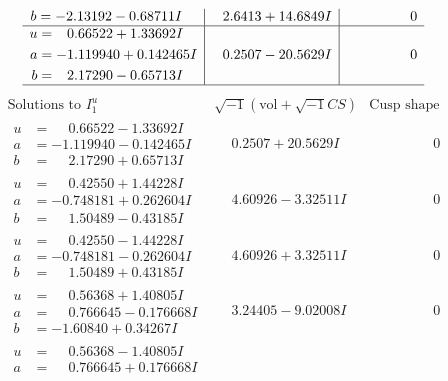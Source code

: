 \documentclass[1p]{elsarticle_modified}
\theoremstyle{definition}
\newcommand{\I}{\sqrt{-1}}
\begin{document}
$$\begin{array}{c|c|c}
\begin{aligned}
b &= -2.13192 - 0.68711 I\end{aligned}
 & \phantom{-}2.6413 + 14.6849 I & \phantom{-0.000000 } 0 \\ \hline\begin{aligned}
u &= \phantom{-}0.66522 + 1.33692 I \\
a &= -1.119940 + 0.142465 I \\
b &= \phantom{-}2.17290 - 0.65713 I\end{aligned}
 & \phantom{-}0.2507 - 20.5629 I & \phantom{-0.000000 } 0\\
 \hline 
 \end{array}$$\newpage$$\begin{array}{c|c|c}  
\text{Solutions to }I^u_{1}& \I (\text{vol} + \sqrt{-1}CS) & \text{Cusp shape}\\
 \hline 
\begin{aligned}
u &= \phantom{-}0.66522 - 1.33692 I \\
a &= -1.119940 - 0.142465 I \\
b &= \phantom{-}2.17290 + 0.65713 I\end{aligned}
 & \phantom{-}0.2507 + 20.5629 I & \phantom{-0.000000 } 0 \\ \hline\begin{aligned}
u &= \phantom{-}0.42550 + 1.44228 I \\
a &= -0.748181 + 0.262604 I \\
b &= \phantom{-}1.50489 - 0.43185 I\end{aligned}
 & \phantom{-}4.60926 - 3.32511 I & \phantom{-0.000000 } 0 \\ \hline\begin{aligned}
u &= \phantom{-}0.42550 - 1.44228 I \\
a &= -0.748181 - 0.262604 I \\
b &= \phantom{-}1.50489 + 0.43185 I\end{aligned}
 & \phantom{-}4.60926 + 3.32511 I & \phantom{-0.000000 } 0 \\ \hline\begin{aligned}
u &= \phantom{-}0.56368 + 1.40805 I \\
a &= \phantom{-}0.766645 - 0.176668 I \\
b &= -1.60840 + 0.34267 I\end{aligned}
 & \phantom{-}3.24405 - 9.02008 I & \phantom{-0.000000 } 0 \\ \hline\begin{aligned}
u &= \phantom{-}0.56368 - 1.40805 I \\
a &= \phantom{-}0.766645 + 0.176668 I \\

\end{aligned}
\end{array}$$
\end{document}
